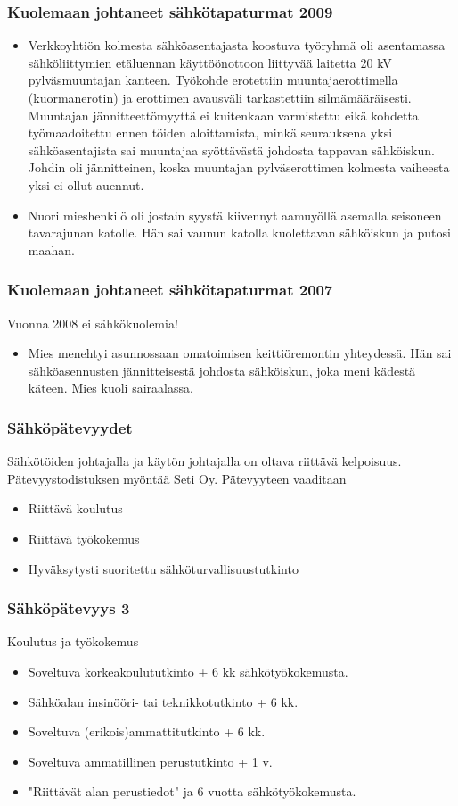 \begin{frame}
\frametitle{Kuolemaan johtaneet sähkötapaturmat 2009}
\begin{itemize}
\item Verkkoyhtiön kolmesta sähköasentajasta koostuva työryhmä oli asentamassa sähköliittymien etäluennan käyttöönottoon liittyvää laitetta 20 kV pylväsmuuntajan kanteen. Työkohde erotettiin muuntajaerottimella (kuormanerotin) ja erottimen avausväli tarkastettiin silmämääräisesti. Muuntajan jännitteettömyyttä ei kuitenkaan varmistettu eikä kohdetta työmaadoitettu ennen töiden aloittamista, minkä seurauksena yksi sähköasentajista sai muuntajaa syöttävästä johdosta tappavan sähköiskun. Johdin oli jännitteinen, koska muuntajan pylväserottimen kolmesta vaiheesta yksi ei ollut auennut.

\item  Nuori mieshenkilö oli jostain syystä kiivennyt aamuyöllä asemalla seisoneen tavarajunan katolle. Hän sai vaunun katolla kuolettavan sähköiskun ja putosi maahan.
\end{itemize}
\end{frame}

\begin{frame}
\frametitle{Kuolemaan johtaneet sähkötapaturmat 2007}
Vuonna 2008 ei sähkökuolemia!
\begin{itemize}
\item Mies menehtyi asunnossaan omatoimisen keittiöremontin yhteydessä. Hän sai sähköasennusten jännitteisestä johdosta sähköiskun, joka meni kädestä käteen. Mies kuoli sairaalassa.
\end{itemize}
\end{frame}


\begin{frame}
\frametitle{Sähköpätevyydet}
Sähkötöiden johtajalla ja käytön johtajalla on oltava riittävä kelpoisuus. Pätevyystodistuksen myöntää Seti Oy. Pätevyyteen vaaditaan
\begin{itemize}
\item Riittävä koulutus
\item Riittävä työkokemus
\item Hyväksytysti suoritettu sähköturvallisuustutkinto
\end{itemize}
\end{frame}

\begin{frame}
\frametitle{Sähköpätevyys 3}
Koulutus ja työkokemus
\begin{itemize}
\item Soveltuva korkeakoulututkinto + 6 kk sähkötyökokemusta.
\item Sähköalan insinööri- tai teknikkotutkinto + 6 kk.
\item Soveltuva (erikois)ammattitutkinto + 6 kk.
\item Soveltuva ammatillinen perustutkinto + 1 v.
\item "Riittävät alan perustiedot" ja 6 vuotta sähkötyökokemusta.
\end{itemize}
\end{frame}


